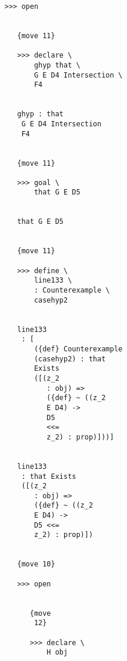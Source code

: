 \documentclass[12pt]{article}
\begin{document}
\begin{verbatim}
                              >>> open


                                 {move 11}

                                 >>> declare \
                                     ghyp that \
                                     G E D4 Intersection \
                                     F4


                                 ghyp : that 
                                  G E D4 Intersection 
                                  F4


                                 {move 11}

                                 >>> goal \
                                     that G E D5


                                 that G E D5


                                 {move 11}

                                 >>> define \
                                     line133 \
                                     : Counterexample \
                                     casehyp2


                                 line133 
                                  : [
                                     ({def} Counterexample 
                                     (casehyp2) : that 
                                     Exists 
                                     ([(z_2 
                                        : obj) => 
                                        ({def} ~ ((z_2 
                                        E D4) -> 
                                        D5 
                                        <<= 
                                        z_2) : prop)]))]


                                 line133 
                                  : that Exists 
                                  ([(z_2 
                                     : obj) => 
                                     ({def} ~ ((z_2 
                                     E D4) -> 
                                     D5 <<= 
                                     z_2) : prop)])


                                 {move 10}

                                 >>> open


                                    {move 
                                     12}

                                    >>> declare \
                                        H obj



\end{verbatim}
\end{document}
